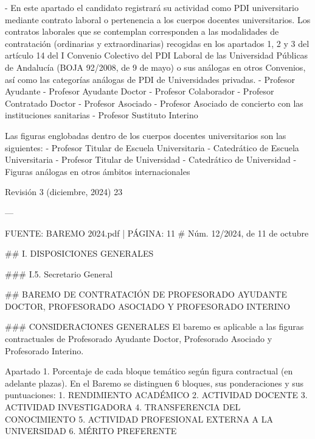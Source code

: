 \documentclass{article}
\begin{document}
\begin{itemize}
\begin{itemize}
\begin{scriptsize}
                  - En este apartado el candidato registrará su actividad como PDI universitario mediante contrato laboral o pertenencia a los cuerpos docentes universitarios. Los contratos laborales que se contemplan corresponden a las modalidades de contratación (ordinarias y extraordinarias) recogidas en los apartados 1, 2 y 3 del artículo 14 del I Convenio Colectivo del PDI Laboral de las Universidad Públicas de Andalucía (BOJA 92/2008, de 9 de mayo) o sus análogas en otros Convenios, así como las categorías análogas de PDI de Universidades privadas.
                  - Profesor Ayudante
                  - Profesor Ayudante Doctor
                  - Profesor Colaborador
                  - Profesor Contratado Doctor
                  - Profesor Asociado
                  - Profesor Asociado de concierto con las instituciones sanitarias
                  - Profesor Sustituto Interino

                  Las figuras englobadas dentro de los cuerpos docentes universitarios son las siguientes:
                  - Profesor Titular de Escuela Universitaria
                  - Catedrático de Escuela Universitaria
                  - Profesor Titular de Universidad
                  - Catedrático de Universidad
                  - Figuras análogas en otros ámbitos internacionales

                  Revisión 3 (diciembre, 2024) 23

                  ---

                  FUENTE: BAREMO 2024.pdf | PÁGINA: 11
                  \# Núm. 12/2024, de 11 de octubre

                  \#\# I. DISPOSICIONES GENERALES

                  \#\#\# I.5. Secretario General

                  \#\# BAREMO DE CONTRATACIÓN DE PROFESORADO AYUDANTE DOCTOR, PROFESORADO ASOCIADO Y PROFESORADO INTERINO

                  \#\#\# CONSIDERACIONES GENERALES
                  El baremo es aplicable a las figuras contractuales de Profesorado Ayudante Doctor, Profesorado Asociado y Profesorado Interino.

                  Apartado 1. Porcentaje de cada bloque temático según figura contractual (en adelante plazas).
                  En el Baremo se distinguen 6 bloques, sus ponderaciones y sus puntuaciones:
                  1. RENDIMIENTO ACADÉMICO
                  2. ACTIVIDAD DOCENTE
                  3. ACTIVIDAD INVESTIGADORA
                  4. TRANSFERENCIA DEL CONOCIMIENTO
                  5. ACTIVIDAD PROFESIONAL EXTERNA A LA UNIVERSIDAD
                  6. MÉRITO PREFERENTE


\end{scriptsize}
\end{itemize}
\end{itemize}
\end{document}
